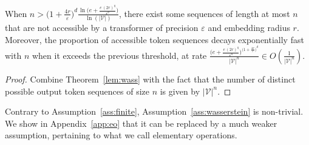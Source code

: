 \begin{corollary}\label{thm:wass}
    When $n> \big(1+\frac{4r}{\varepsilon}\big)^d\frac{\operatorname{ln}\big(e + \frac{e \, (2r)^q}{\varepsilon^q}\big)}{\operatorname{ln}(|\mathcal V|)}$, there exist some sequences of length at most $n$ that are not accessible by a transformer of precision $\varepsilon$ and embedding radius $r$. Moreover, the proportion of accessible token sequences decays exponentially fast with $n$ when it exceeds the previous threshold, at rate $\frac{\big(e + \frac{e \, (2r)^q}{\varepsilon^q}\big)^{\big(1+\frac{4r}{\varepsilon}\big)^d}}{|\mathcal V|^n}\in O(\frac1{|\mathcal V|^n})$.
\end{corollary}

\begin{proof}
    Combine Theorem~\ref{lem:wass} with the fact that the number of distinct possible output token sequences of size $n$ is given by $|\mathcal V|^n$.
\end{proof}

\begin{remark}
    Contrary to Assumption~\ref{ass:finite}, Assumption~\ref{ass:wasserstein} is non-trivial. We show in Appendix~\ref{app:eo} that it can be replaced by a much weaker assumption, pertaining to what we call elementary operations.
\end{remark}


